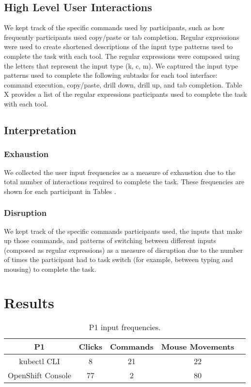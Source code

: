 \documentclass[11pt, oneside]{article}   	%
\begin{document}
\subsection{High Level User Interactions}
We kept track of the specific commands used by participants, such as how frequently participants used copy/paste or tab completion. Regular expressions were used to create shortened descriptions of the input type patterns used to complete the task with each tool. The regular expressions were composed using the letters that represent the input type (k, c, m). We captured the input type patterns used to complete the following subtasks for each tool interface: command execution, copy/paste, drill down, drill up, and tab completion. Table X provides a list of the regular expressions participants used to complete the task with each tool. 

\subsection{Interpretation}
\subsubsection{Exhaustion}
We collected the user input frequencies as a measure of exhaustion due to the total number of interactions required to complete the task. These frequencies are shown for each participant in Tables \text{\ref{table:t1}--\ref{table:t4}}.
\subsubsection{Disruption}
We kept track of the specific commands participants used, the inputs that make up those commands, and patterns of switching between different inputs (composed as regular expressions) as a measure of disruption due to the number of times the participant had to task switch (for example, between typing and mousing) to complete the task. 

\section{Results}

\begin{table}
 \centering
  \begin{tabular}{ | c | c | c | c | c | }
  \hline
  P1 & Clicks & Commands & Mouse Movements \\ 
  \hline
  kubectl CLI & 8 & 21 & 22 \\ 
  \hline
  OpenShift Console & 77 & 2 & 80 \\ 
  \hline
  \end{tabular}
 \caption{P1 input frequencies.}
 \label{table:t1}
\end{table}
\end{document}
